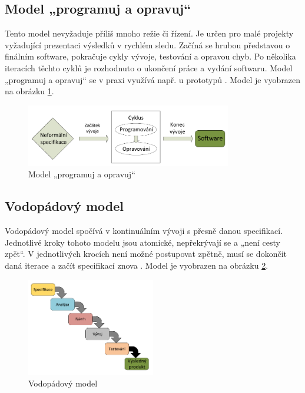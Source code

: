 \subsection{Model „programuj a opravuj“}
Tento model nevyžaduje příliš mnoho režie či řízení. Je určen pro malé projekty vyžadující prezentaci výsledků v rychlém sledu. Začíná se hrubou představou o finálním software, pokračuje cykly vývoje, testování a opravou chyb. Po několika iteracích těchto cyklů je rozhodnuto o ukončení práce a vydání softwaru. Model „programuj a opravuj“ se v praxi využívá např. u prototypů \cite{Patton2002}. Model je vyobrazen na obrázku \ref{fig:program-and-repair-model}.


\begin{figure}[h]
	\centering
	\includegraphics[width=0.8\textwidth]{Figures/ProgramujOpravuj.pdf}
	\caption{Model „programuj a opravuj“}
	\label{fig:program-and-repair-model}
\end{figure}

\subsection{Vodopádový model}
Vodopádový model spočívá v kontinuálním vývoji s přesně danou specifikací. Jednotlivé kroky tohoto modelu jsou atomické, nepřekrývají se a „není cesty zpět“. V jednotlivých krocích není možné postupovat zpětně, musí se dokončit daná iterace a začít specifikací znova \cite{Patton2002}. Model je vyobrazen na obrázku \ref{fig:waterfall-model}.

\begin{figure}[!h]
	\centering
	\includegraphics[width=0.5\textwidth]{Figures/waterfall.pdf}
	\caption{Vodopádový model}
	\label{fig:waterfall-model}
\end{figure}
\newpage

